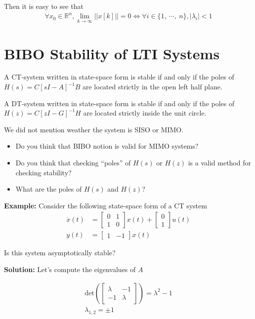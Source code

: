 \documentclass[twoside]{article}
\begin{document}
Then it is easy to see that
\begin{align*}
    \forall x_0 \in \mathbb{R}^n, \lim_{k \to \infty} || x[k] || = 0
    \iff \forall i \in \lbrace 1 , \ \cdots ,  \ n \rbrace, |
  \lambda_i | < 1
\end{align*}

\section{BIBO Stability of LTI Systems}

A CT-system written in state-space form 
is stable if and only if the poles of $H(s) = C \left[ s I -
  A\right]^{-1} B$ are located strictly in the open left
half plane. 

A DT-system written in state-space form 
is stable if and only if the poles of $H(z) = C \left[ z I -
  G\right]^{-1} H $ are located strictly inside the
unit circle.

We did not mention weather the system is SISO or MIMO. 
%
\begin{itemize}
  \item Do you think that BIBO notion is valid for MIMO systems? 
  \item Do you think that checking ``poles'' of $H(s)$ or $H(z)$ is
    a valid method for checking stability?
    \item What are the poles of $H(s)$ and $H(z)$?
\end{itemize}

\textbf{Example:} Consider the following state-space form of a
CT system 
%
\begin{align*}
\dot{x}(t) &= 
\left[ \begin{array}{cc} 0 & 1 \\ 1 & 0 \end{array} \right]
x(t)
+
\left[ \begin{array}{c} 0 \\ 1 \end{array} \right] u(t)
\\
y(t) &= \left[ \begin{array}{cc} 1 & -1 \end{array} \right] x(t)
\end{align*}

Is this system asymptotically stable? 

\textbf{Solution:} Let's compute the eigenvalues of $A$

\begin{align*}
\mathrm{det} \left( \left[ \begin{array}{cc} \lambda & -1 \\ -1 &
                                                                  \lambda \end{array}
                                                                  \right]
                                                                  \right)
                                                                  =
                                                                  \lambda^2
                                                                  - 1
\\
\lambda_{1,2} = \pm 1
\end{align*}
\end{document}
